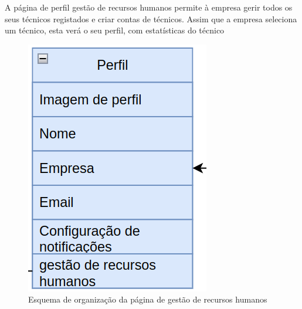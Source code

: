 A página de perfil gestão de recursos humanos permite à empresa gerir todos os seus técnicos registados 
e criar contas de técnicos. Assim que a empresa seleciona um técnico, esta verá o seu perfil, 
com estatísticas do técnico
\begin{figure}[htb]
    \centering
    
    \includegraphics[height=0.35\textwidth]{images/Arquiteturas/superficial_de_app/perfil.png}
    \caption{Esquema de organização da página de gestão de recursos humanos}
    \label{fig:11}
\end{figure}